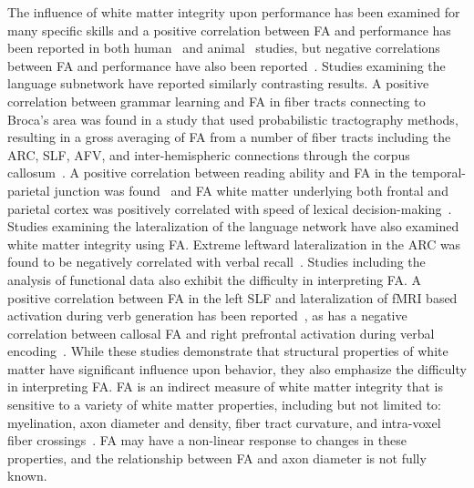 The influence of white matter integrity upon performance has been examined for many specific skills and a positive correlation between FA and performance has been reported in both human~\cite{Wolbers2006,Johansen-Berg2007} and animal~\cite{Makris2007} studies, but negative correlations between FA and performance have also been reported~\cite{Tuch2005,Hoeft2007}. Studies examining the language subnetwork have reported similarly contrasting results. A positive correlation between grammar learning and FA in fiber tracts connecting to Broca's area was found in a study that used probabilistic tractography methods, resulting in a gross averaging of FA from a number of fiber tracts including the ARC, SLF, AFV, and inter-hemispheric connections through the corpus callosum~\cite{Floel2009}. A positive correlation between reading ability and FA in the temporal-parietal junction was found~\cite{Klingberg2000} and FA white matter underlying both frontal and parietal cortex was positively correlated with speed of lexical decision-making~\cite{Gold2007}. Studies examining the lateralization of the language network have also examined white matter integrity using FA. Extreme leftward lateralization in the ARC was found to be negatively correlated with verbal recall~\cite{Catani2007}. Studies including the analysis of functional data also exhibit the difficulty in interpreting FA. A positive correlation between FA in the left SLF and lateralization of fMRI based activation during verb generation has been reported~\cite{Powell2006}, as has a negative correlation between callosal FA and right prefrontal activation during verbal encoding~\cite{Putnam2008}. While these studies demonstrate that structural properties of white matter have significant influence upon behavior, they also emphasize the difficulty in interpreting FA. FA is an indirect measure of white matter integrity that is sensitive to a variety of white matter properties, including but not limited to: myelination, axon diameter and density, fiber tract curvature, and intra-voxel fiber crossings~\cite{Barkovich2000,Shimony1999,Virta1999}. FA may have a non-linear response to changes in these properties, and the relationship between FA and axon diameter is not fully known.  

